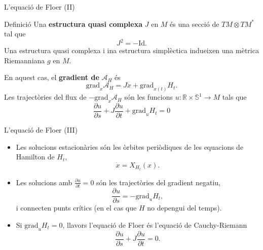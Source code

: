 \documentclass{beamer}
\newcommand{\con}[1]{\mathbb{#1}}
\newcommand{\R}{\con{R}}
\begin{document}
\begin{frame}{L'equació de Floer (II)}
	\begin{block}{Definició}
		Una {\bf estructura quasi complexa} $J$ en $M$ és una secció de $TM\otimes TM^{\ast}$ tal que
		\[J^2 = - \mathrm{Id} .\]
		Una estructura quasi complexa i ina estructura simplèctica indueixen una mètrica Riemanniana $g$ en $M$.
	\end{block}

	En aquest cas, el {\bf gradient de} $\mathcal{A}_H$ és
	\[\mathrm{grad}_x\mathcal{A}_H = J \dot{x} + \mathrm{grad}_{x(t)}H_t .\]
	Les trajectòries del flux de $- \mathrm{grad}_x\mathcal{A}_H$ són les funcions $u : \R \times \con{S}^1 \rightarrow M$ tals que
	\[\frac{\partial u}{\partial s} + J \frac{\partial u}{\partial t} + \mathrm{grad}_uH_t = 0\]
\end{frame}

\begin{frame}{L'equació de Floer (III)}
	\begin{itemize}
		\item Les solucions estacionàries són les òrbites periòdiques de les equacions de Hamilton de $H_t$,
		\[\dot{x} = X_{H_t}(x) .\]
		\item Les solucions amb $\frac{\partial u}{\partial t} = 0$ són les trajectòries del gradient negatiu,
		\[\frac{\partial u}{\partial s} = - \mathrm{grad}_uH_t ,\]
		i connecten punts crítics (en el cas que $H$ no depengui del temps).
		\item Si $\mathrm{grad}_uH_t = 0$, llavors l'equació de Floer és l'equació de Cauchy-Riemann
		\[\frac{\partial u}{\partial s} + J \frac{\partial u}{\partial t} = 0 .\]
	\end{itemize}
\end{frame}


%
\end{document}
